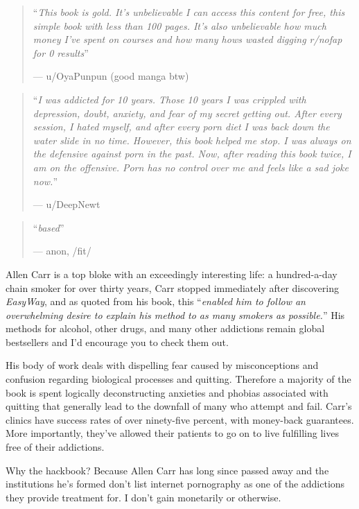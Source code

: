\documentclass[
]{book}
\begin{document}
\begin{quote}
``\emph{This book is gold. It's unbelievable I can access this content for free, this simple book with less than 100 pages. It's also unbelievable how much money I've spent on courses and how many hows wasted digging r/nofap for 0 results}''

--- u/OyaPunpun (good manga btw)
\end{quote}

\begin{quote}
``\emph{I was addicted for 10 years. Those 10 years I was crippled with depression, doubt, anxiety, and fear of my secret getting out. After every session, I hated myself, and after every porn diet I was back down the water slide in no time. However, this book helped me stop. I was always on the defensive against porn in the past. Now, after reading this book twice, I am on the offensive. Porn has no control over me and feels like a sad joke now.}''

--- u/DeepNewt
\end{quote}

\begin{quote}
``\emph{based}''

--- anon, /fit/
\end{quote}

Allen Carr is a top bloke with an exceedingly interesting life: a hundred-a-day chain smoker for over thirty years, Carr stopped immediately after discovering \emph{EasyWay}, and as quoted from his book, this ``\emph{enabled him to follow an overwhelming desire to explain his method to as many smokers as possible.}'' His methods for alcohol, other drugs, and many other addictions remain global bestsellers and I'd encourage you to check them out.

His body of work deals with dispelling fear caused by misconceptions and confusion regarding biological processes and quitting. Therefore a majority of the book is spent logically deconstructing anxieties and phobias associated with quitting that generally lead to the downfall of many who attempt and fail. Carr's clinics have success rates of over ninety-five percent, with money-back guarantees. More importantly, they've allowed their patients to go on to live fulfilling lives free of their addictions.

Why the hackbook? Because Allen Carr has long since passed away and the institutions he's formed don't list internet pornography as one of the addictions they provide treatment for. I don't gain monetarily or otherwise.
\end{document}
